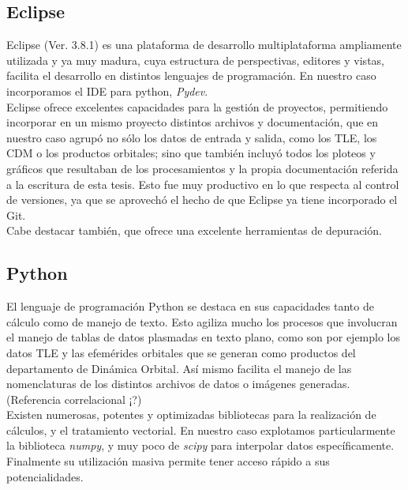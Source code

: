 \subsection*{Eclipse}
Eclipse (Ver. 3.8.1) es una plataforma de desarrollo multiplataforma ampliamente utilizada y ya muy madura, cuya estructura de perspectivas, editores y vistas, facilita el desarrollo en distintos lenguajes de programaci\'on. En nuestro caso incorporamos el IDE para python, {\it{Pydev}}.\\
Eclipse ofrece excelentes capacidades para la gesti\'on de proyectos, permitiendo incorporar en un mismo proyecto distintos archivos y documentaci\'on, que en nuestro caso agrup\'o no s\'olo los datos de entrada y salida, como los TLE, los CDM o los productos orbitales; sino que tambi\'en incluy\'o todos los ploteos y gr\'aficos que resultaban de los procesamientos y la propia documentaci\'on referida a la escritura de esta tesis. Esto fue muy productivo en lo que respecta al control de versiones, ya que se aprovech\'o el hecho de que Eclipse ya tiene incorporado el Git.\\
Cabe destacar también, que ofrece una excelente herramientas de depuraci\'on.\\

\subsection*{Python}
El lenguaje de programaci\'on Python se destaca en sus capacidades tanto de c\'alculo como de manejo de texto. Esto agiliza mucho los procesos que involucran el manejo de tablas de datos plasmadas en texto plano, como son por ejemplo los datos TLE y las efem\'erides orbitales que se generan como productos del departamento de Din\'amica Orbital. As\'i mismo facilita el manejo de las nomenclaturas de los distintos archivos de datos o im\'agenes generadas. (Referencia correlacional ¡?)\\
Existen numerosas, potentes y optimizadas bibliotecas para la realizaci\'on de c\'alculos, y el tratamiento vectorial. En nuestro caso explotamos particularmente la biblioteca {\it{numpy}}, y muy poco de {\it{scipy}} para interpolar datos espec\'ificamente.\\
Finalmente su utilizaci\'on masiva permite tener acceso r\'apido a sus potencialidades.\\


